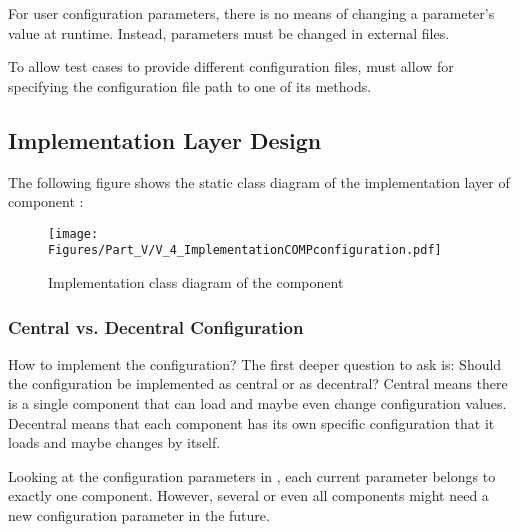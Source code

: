 For user configuration parameters, there is no means of changing a parameter's value at runtime. Instead, parameters must be changed in external files.

To allow test cases to provide different configuration files, \COMPconfiguration{} must allow for specifying the configuration file path to one of its methods.


\subsection{Implementation Layer Design}
\label{sec:ImplementationDesignCOMPconfiguration}

The following figure shows the static class diagram of the implementation layer of component \COMPconfiguration{}:

\begin{figure}[H]
	\centering
	\texttt{[image: Figures/Part\_V/V\_4\_ImplementationCOMPconfiguration.pdf]}
	\caption{Implementation class diagram of the component \COMPconfiguration{}}
	\label{fig:V_4_ImplementationCOMPconfiguration}
\end{figure}


\subsubsection{Central vs. Decentral Configuration}
\label{sec:CentralVsDecentralConfiguration}

How to implement the configuration? The first deeper question to ask is: Should the configuration be implemented as central or as decentral? Central means there is a single component that can load and maybe even change configuration values. Decentral means that each \LibName{} component has its own specific configuration that it loads and maybe changes by itself.

Looking at the configuration parameters in , each current parameter belongs to exactly one component. However, several or even all components might need a new configuration parameter in the future.

